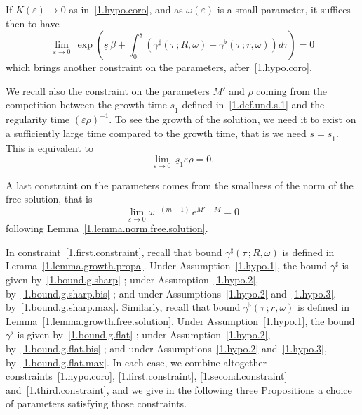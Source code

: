 \documentclass[AHL,Unicode,longabstracts,published]{cedram}
\theoremstyle{plain}
\newcommand*\e{\varepsilon}
\newcommand*\g{\gamma}
\newcommand*\und{\underline}
\begin{document}
If $K(\e) \to 0$ as in~\eqref{1.hypo.coro}, and as $\omega(\e)$ is a small parameter, it suffices then to have
\begin{equation}\label{1.first.constraint}
\lim_{\e\to0} \,\exp\left(\und{s}\,\beta + \int_{0}^{\und{s}} (\g^{\sharp}(\tau\,;R, \omega) - \g^{\flat}(\tau\,;r, \omega)) d\tau \right) = 0
\end{equation}
which brings another constraint on the parameters, after~\eqref{1.hypo.coro}.

We recall also the constraint on the parameters $M'$ and $\rho$ coming from the competition between the growth time $\und{s}_1$ defined in~\eqref{1.def.und.s.1} and the regularity time $(\e\rho)^{-1}$. To see the growth of the solution, we need it to exist on a sufficiently large time compared to the growth time, that is we need $\und{s} = \und{s}_1$. This is equivalent to
\begin{equation}\label{1.second.constraint}
\lim_{\e\to0} \,\und{s}_1\e\rho =0.
\end{equation}

A last constraint on the parameters comes from the smallness of the norm of the free solution, that is
\begin{equation}\label{1.third.constraint}
\lim_{\e \to0} \omega^{-(m-1)}\,e^{M' - M} = 0
\end{equation}
following Lemma~\ref{1.lemma.norm.free.solution}.

In constraint~\eqref{1.first.constraint}, recall that bound $\g^{\sharp}(\tau\,;R,\omega)$ is defined in Lemma~\ref{1.lemma.growth.propa}. Under Assumption~\ref{1.hypo.1}, the bound $\g^{\sharp}$ is given by~\eqref{1.bound.g.sharp} ; under Assumption~\ref{1.hypo.2}, by~\eqref{1.bound.g.sharp.bis} ; and under Assumptions~\ref{1.hypo.2} and~\ref{1.hypo.3}, by~\eqref{1.bound.g.sharp.max}. Similarly, recall that bound $\g^{\flat}(\tau\,;r,\omega)$ is defined in Lemma~\ref{1.lemma.growth.free.solution}. Under Assumption~\ref{1.hypo.1}, the bound $\g^{\flat}$ is given by~\eqref{1.bound.g.flat} ; under Assumption~\ref{1.hypo.2}, by~\eqref{1.bound.g.flat.bis} ; and under Assumptions~\ref{1.hypo.2} and~\ref{1.hypo.3}, by~\eqref{1.bound.g.flat.max}. In each case, we combine altogether constraints~\eqref{1.hypo.coro}, \eqref{1.first.constraint}, \eqref{1.second.constraint} and~\eqref{1.third.constraint}, and we give in the following three Propositions a choice of parameters satisfying those constraints.
\end{document}
